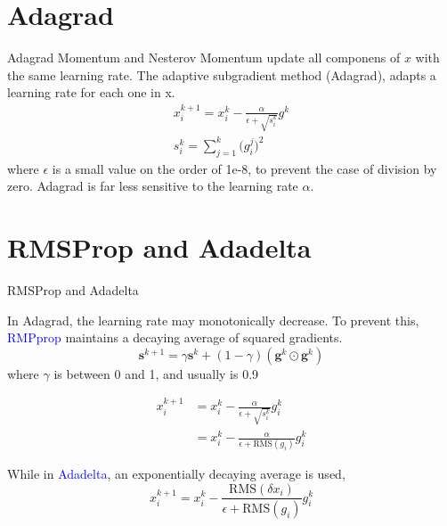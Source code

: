 \documentclass{beamer}
\begin{document}
\section{Adagrad}
\begin{frame}{Adagrad}
Momentum and Nesterov Momentum update all componens of $x$ with the same learning rate. The adaptive subgradient method (Adagrad), adapts a learning rate for each one in x.
\begin{gather*}
    x_i^{k+1} = x_i^k - \frac{\alpha}{\epsilon + \sqrt{s_i^k}} g^k \\
    s_i^k = \sum_{j=1}^k \bigg(g_i^j\bigg)^2 
\end{gather*}
where $\epsilon$ is a small value on the order of 1e-8, to prevent the case of division by zero. 
Adagrad is far less sensitive to the learning rate $\alpha$. 
\end{frame}

\section{RMSProp and Adadelta}
\begin{frame}{RMSProp and Adadelta}

In Adagrad, the learning rate may monotonically decrease. To prevent this, \textcolor{blue}{RMPprop} maintains a decaying average of squared gradients.
\begin{equation*}
    \boldsymbol{s}^{k+1} = \gamma \boldsymbol{s}^k + (1-\gamma)(\boldsymbol{g}^k \odot \boldsymbol{g}^k)
\end{equation*}
where $\gamma$ is between 0 and 1, and usually is 0.9

\begin{equation*}
\begin{split}
    x_i^{k+1} &= x_i^k - \frac{\alpha}{\epsilon + \sqrt{s_i^k}} g_i^k \\
              &= x_i^k - \frac{\alpha}{\epsilon + \textrm{RMS}(g_i)} g_i^k        
\end{split}
\end{equation*}

While in \textcolor{blue}{Adadelta}, an exponentially decaying average is used,
\begin{equation*}
    x_i^{k+1} = x_i^k - \frac{\textrm{RMS}(\delta x_i)}{\epsilon + \textrm{RMS}(g_i)} g_i^k        

\end{equation*}
\end{frame}
\end{document}

